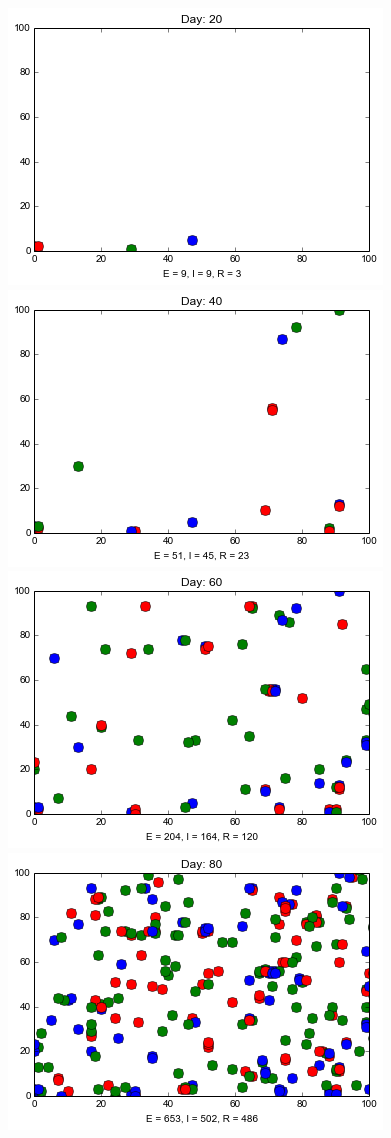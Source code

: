 \begin{figure}
\medskip
\includegraphics[scale=0.25]{images/3t20.png} \quad
\includegraphics[scale=0.25]{images/3t40.png} \quad
\includegraphics[scale=0.25]{images/3t60.png} \quad
\includegraphics[scale=0.25]{images/3t80.png} 


\end{figure}
